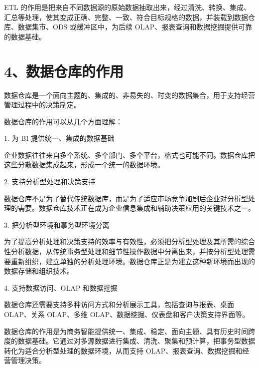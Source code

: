\documentclass[UTF8,zihao=-4]{ctexart}
\begin{document}
ETL 的作用是把来自不同数据源的原始数据抽取出来，经过清洗、转换、集成、汇总等处理，使其变成正确、完整、一致、符合目标规格的数据，并装载到数据仓库、数据集市、ODS 或缓冲区中，为后续 OLAP、报表查询和数据挖掘提供可靠的数据基础。\par

\newpage
\section*{4、数据仓库的作用}

数据仓库是一个面向主题的、集成的、非易失的、时变的数据集合，用于支持经营管理过程中的决策制定。\par

数据仓库的作用可以从几个方面理解：\par

1. 为 BI 提供统一、集成的数据基础\par

企业数据往往来自多个系统、多个部门、多个平台，格式也可能不同。数据仓库把这些分散数据集成起来，形成一个统一的数据环境。\par

2. 支持分析型处理和决策支持\par

数据仓库不是为了替代传统数据库，而是为了适应市场竞争加剧后企业对分析型处理的需要。数据仓库技术正在成为企业信息集成和辅助决策应用的关键技术之一。\par

3. 把分析型环境和事务型环境分离\par

为了提高分析处理和决策支持的效率与有效性，必须把分析型处理及其所需的综合性分析数据，从传统事务型处理和细节性操作数据中分离出来，并按分析型处理需要重新组织，建立单独的分析处理环境。数据仓库正是为建立这种新环境而出现的数据存储和组织技术。\par

4. 支持数据访问、OLAP 和数据挖掘\par

数据仓库还需要支持多种访问方式和分析展示工具，包括查询与报表、桌面 OLAP、关系 OLAP、多维 OLAP、数据挖掘、仪表盘和客户决策支持界面等。\par

数据仓库的作用是为商务智能提供统一、集成、稳定、面向主题、具有历史时间跨度的数据基础。它通过对多源数据进行集成、清洗、聚集和预计算，把事务型数据转化为适合分析型处理的数据环境，从而支持 OLAP、报表查询、数据挖掘和经营管理决策。\par
\end{document}
